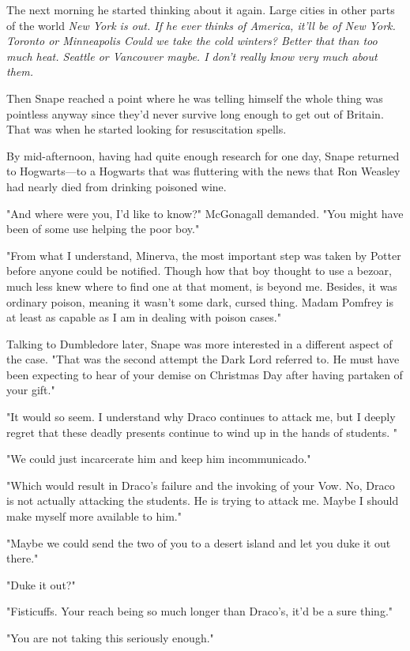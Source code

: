 The next morning he started thinking about it again. Large cities in other parts of the world{\el} \emph{New York is out. If he ever thinks of America, it'll be of New York. Toronto or Minneapolis{\el} Could we take the cold winters? Better that than too much heat. Seattle or Vancouver{\el} maybe. I don't really know very much about them.}

Then Snape reached a point where he was telling himself the whole thing was pointless anyway since they'd never survive long enough to get out of Britain. That was when he started looking for resuscitation spells.

By mid-afternoon, having had quite enough research for one day, Snape returned to Hogwarts—to a Hogwarts that was fluttering with the news that Ron Weasley had nearly died from drinking poisoned wine.

"And where were you, I'd like to know?" McGonagall demanded. "You might have been of some use helping the poor boy."

"From what I understand, Minerva, the most important step was taken by Potter before anyone could be notified. Though how that boy thought to use a bezoar, much less knew where to find one at that moment, is beyond me. Besides, it was ordinary poison, meaning it wasn't some dark, cursed thing. Madam Pomfrey is at least as capable as I am in dealing with poison cases."

Talking to Dumbledore later, Snape was more interested in a different aspect of the case. "That was the second attempt the Dark Lord referred to. He must have been expecting to hear of your demise on Christmas Day after having partaken of your gift."

"It would so seem. I understand why Draco continues to attack me, but I deeply regret that these deadly presents continue to wind up in the hands of students. "

"We could just incarcerate him and keep him incommunicado."

"Which would result in Draco's failure and the invoking of your Vow. No, Draco is not actually attacking the students. He is trying to attack me. Maybe I should make myself more available to him."

"Maybe we could send the two of you to a desert island and let you duke it out there."

"Duke it out?"

"Fisticuffs. Your reach being so much longer than Draco's, it'd be a sure thing."

"You are not taking this seriously enough."

